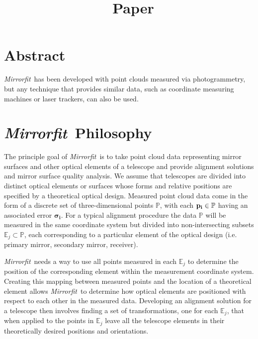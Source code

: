 \documentclass{article}
\title{\mf\ Paper}
\newcommand{\mf}{\textit{Mirrorfit}}
\newcommand{\sfont}[1]{\mathbb{#1}}
\begin{document}
\section{Abstract}

\mf\ has been developed with point clouds measured via photogrammetry, but any technique that provides similar data, such as coordinate measuring machines or laser trackers, can also be used. 
\section{\mf\ Philosophy}

The principle goal of \mf\ is to take point cloud data representing mirror surfaces and other optical elements of a telescope and provide alignment solutions and mirror surface quality analysis.
We assume that telescopes are divided into distinct optical elements or surfaces whose forms and relative positions are specified by a theoretical optical design. 
Measured point cloud data come in the form of a discrete set of three-dimensional points $\sfont{P}$, with each $\bf{p_i} \in \sfont{P}$ having an associated error $\pmb{\sigma_{i}}$. 
For a typical alignment procedure the data $\sfont{P}$ will be measured in the same coordinate system but divided into non-intersecting subsets $\sfont{E}_j \subset \sfont{P}$, each corresponding to a particular element of the optical design (i.e. primary mirror, secondary mirror, receiver).

\mf\ needs a way to use all points measured in each $\sfont{E}_j$ to determine the position of the corresponding element within the measurement coordinate system.
Creating this mapping between measured points and the location of a theoretical element allows \mf\ to determine how optical elements are positioned with respect to each other in the measured data. 
Developing an alignment solution for a telescope then involves finding a set of transformations, one for each $\sfont{E}_j$, that when applied to the points in $\sfont{E}_j$ leave all the telescope elements in their theoretically desired positions and orientations.
\end{document}
